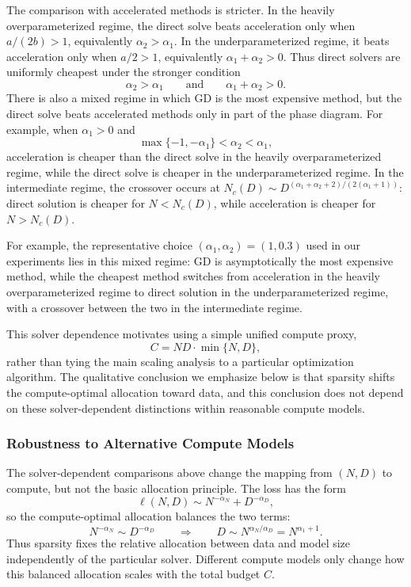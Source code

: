 \documentclass[11pt]{article}
\theoremstyle{plain}
\theoremstyle{definition}
\theoremstyle{remark}
\begin{document}
The comparison with accelerated methods is stricter. In the heavily overparameterized regime, the direct solve beats acceleration only when $a/(2b)>1$, equivalently $\alpha_2>\alpha_1$. In the underparameterized regime, it beats acceleration only when $a/2>1$, equivalently $\alpha_1+\alpha_2>0$. Thus direct solvers are uniformly cheapest under the stronger condition
\begin{equation}
\alpha_2>\alpha_1
\qquad\text{and}\qquad
\alpha_1+\alpha_2>0.
\end{equation}
There is also a mixed regime in which GD is the most expensive method, but the direct solve beats accelerated methods only in part of the phase diagram. For example, when $\alpha_1>0$ and
\begin{equation}
\max\{-1,-\alpha_1\}<\alpha_2<\alpha_1,
\end{equation}
acceleration is cheaper than the direct solve in the heavily overparameterized regime, while the direct solve is cheaper in the underparameterized regime. In the intermediate regime, the crossover occurs at $N_c(D)\sim D^{(\alpha_1+\alpha_2+2)/(2(\alpha_1+1))}$: direct solution is cheaper for $N<N_c(D)$, while acceleration is cheaper for $N>N_c(D)$.

For example, the representative choice $(\alpha_1,\alpha_2)=(1,0.3)$ used in our experiments lies in this mixed regime: GD is asymptotically the most expensive method, while the cheapest method switches from acceleration in the heavily overparameterized regime to direct solution in the underparameterized regime, with a crossover between the two in the intermediate regime.



This solver dependence motivates using a simple unified compute proxy,
\begin{equation}
C=ND\cdot \min\{N,D\},
\label{eq:proxy}
\end{equation}
rather than tying the main scaling analysis to a particular optimization algorithm. The qualitative conclusion we emphasize below is that sparsity shifts the compute-optimal allocation toward data, and this conclusion does not depend on these solver-dependent distinctions within reasonable compute models.


\subsubsection{Robustness to Alternative Compute Models}

The solver-dependent comparisons above change the mapping from $(N,D)$ to compute, but not the basic allocation principle. The loss has the form
\begin{equation}
\ell(N,D)\sim N^{-\alpha_N}+D^{-\alpha_D},
\end{equation}
so the compute-optimal allocation balances the two terms:
\begin{equation}
N^{-\alpha_N}\sim D^{-\alpha_D}
\qquad\Longrightarrow\qquad
D\sim N^{\alpha_N/\alpha_D}=N^{\alpha_1+1}.
\end{equation}
Thus sparsity fixes the relative allocation between data and model size independently of the particular solver. Different compute models only change how this balanced allocation scales with the total budget $C$.
\end{document}
